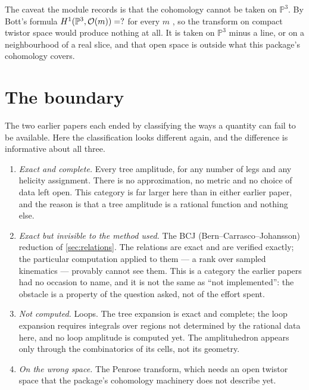 \documentclass[11pt,a4paper]{article}
\newcommand{\PP}{\mathbb{P}}
\newcommand{\cO}{\mathcal{O}}
\theoremstyle{definition}
\begin{document}
The caveat the module records is that the cohomology cannot be taken on
$\PP^3$. By Bott's formula $H^1(\PP^3, \cO(m)) = \TFPenroseHOne$ for every
$m$ \cite{Bott1957}, so the transform on compact twistor space would produce nothing at all.
It is taken on $\PP^3$ minus a line, or on a neighbourhood of a real slice,
and that open space is outside what this package's cohomology covers.


\section{The boundary}
\label{sec:boundary}

The two earlier papers each ended by classifying the ways a quantity can fail
to be available. Here the classification looks different again, and the
difference is informative about all three.

\begin{enumerate}[leftmargin=2em]
\item \emph{Exact and complete.} Every tree amplitude, for any number of legs
and any helicity assignment. There is no approximation, no metric and no
choice of data left open. This category is far larger here than in either
earlier paper, and the reason is that a tree amplitude is a rational function
and nothing else.

\item \emph{Exact but invisible to the method used.} The BCJ (Bern--Carrasco--Johansson) reduction of
\cref{sec:relations}. The relations are exact and are verified exactly; the
particular computation applied to them --- a rank over sampled kinematics ---
provably cannot see them. This is a category the earlier papers had no
occasion to name, and it is not the same as ``not implemented'': the obstacle
is a property of the question asked, not of the effort spent.

\item \emph{Not computed.} Loops. The tree expansion is exact and complete;
the loop expansion requires integrals over regions not determined by the
rational data here, and no loop amplitude is computed yet. The amplituhedron
appears only through the combinatorics of its cells, not its geometry.

\item \emph{On the wrong space.} The Penrose transform, which needs an open
twistor space that the package's cohomology machinery does not describe yet.
\end{enumerate}
\end{document}

